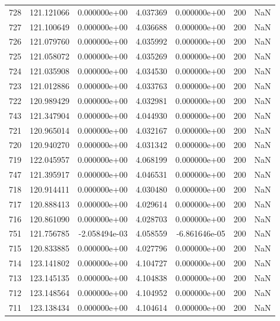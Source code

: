 \begin{tabular}{rrrrrrr}
 728 & 121.121066 &  0.000000e+00 &  4.037369 &  0.000000e+00 &         200 & NaN \\
 727 & 121.100649 &  0.000000e+00 &  4.036688 &  0.000000e+00 &         200 & NaN \\
 726 & 121.079760 &  0.000000e+00 &  4.035992 &  0.000000e+00 &         200 & NaN \\
 725 & 121.058072 &  0.000000e+00 &  4.035269 &  0.000000e+00 &         200 & NaN \\
 724 & 121.035908 &  0.000000e+00 &  4.034530 &  0.000000e+00 &         200 & NaN \\
 723 & 121.012886 &  0.000000e+00 &  4.033763 &  0.000000e+00 &         200 & NaN \\
 722 & 120.989429 &  0.000000e+00 &  4.032981 &  0.000000e+00 &         200 & NaN \\
 743 & 121.347904 &  0.000000e+00 &  4.044930 &  0.000000e+00 &         200 & NaN \\
 721 & 120.965014 &  0.000000e+00 &  4.032167 &  0.000000e+00 &         200 & NaN \\
 720 & 120.940270 &  0.000000e+00 &  4.031342 &  0.000000e+00 &         200 & NaN \\
 719 & 122.045957 &  0.000000e+00 &  4.068199 &  0.000000e+00 &         200 & NaN \\
 747 & 121.395917 &  0.000000e+00 &  4.046531 &  0.000000e+00 &         200 & NaN \\
 718 & 120.914411 &  0.000000e+00 &  4.030480 &  0.000000e+00 &         200 & NaN \\
 717 & 120.888413 &  0.000000e+00 &  4.029614 &  0.000000e+00 &         200 & NaN \\
 716 & 120.861090 &  0.000000e+00 &  4.028703 &  0.000000e+00 &         200 & NaN \\
 751 & 121.756785 & -2.058494e-03 &  4.058559 & -6.861646e-05 &         200 & NaN \\
 715 & 120.833885 &  0.000000e+00 &  4.027796 &  0.000000e+00 &         200 & NaN \\
 714 & 123.141802 &  0.000000e+00 &  4.104727 &  0.000000e+00 &         200 & NaN \\
 713 & 123.145135 &  0.000000e+00 &  4.104838 &  0.000000e+00 &         200 & NaN \\
 712 & 123.148564 &  0.000000e+00 &  4.104952 &  0.000000e+00 &         200 & NaN \\
 711 & 123.138434 &  0.000000e+00 &  4.104614 &  0.000000e+00 &         200 & NaN \\

\end{tabular}
